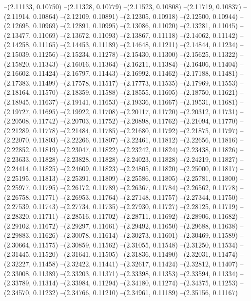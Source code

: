--(2.11133, 0.10750)
--(2.11328, 0.10779)
--(2.11523, 0.10808)
--(2.11719, 0.10837)
--(2.11914, 0.10864)
--(2.12109, 0.10891)
--(2.12305, 0.10918)
--(2.12500, 0.10944)
--(2.12695, 0.10969)
--(2.12891, 0.10995)
--(2.13086, 0.11020)
--(2.13281, 0.11045)
--(2.13477, 0.11069)
--(2.13672, 0.11093)
--(2.13867, 0.11118)
--(2.14062, 0.11142)
--(2.14258, 0.11165)
--(2.14453, 0.11189)
--(2.14648, 0.11211)
--(2.14844, 0.11234)
--(2.15039, 0.11256)
--(2.15234, 0.11278)
--(2.15430, 0.11300)
--(2.15625, 0.11322)
--(2.15820, 0.11343)
--(2.16016, 0.11364)
--(2.16211, 0.11384)
--(2.16406, 0.11404)
--(2.16602, 0.11424)
--(2.16797, 0.11443)
--(2.16992, 0.11462)
--(2.17188, 0.11481)
--(2.17383, 0.11499)
--(2.17578, 0.11517)
--(2.17773, 0.11535)
--(2.17969, 0.11553)
--(2.18164, 0.11570)
--(2.18359, 0.11588)
--(2.18555, 0.11605)
--(2.18750, 0.11621)
--(2.18945, 0.11637)
--(2.19141, 0.11653)
--(2.19336, 0.11667)
--(2.19531, 0.11681)
--(2.19727, 0.11695)
--(2.19922, 0.11708)
--(2.20117, 0.11720)
--(2.20312, 0.11731)
--(2.20508, 0.11742)
--(2.20703, 0.11752)
--(2.20898, 0.11762)
--(2.21094, 0.11770)
--(2.21289, 0.11778)
--(2.21484, 0.11785)
--(2.21680, 0.11792)
--(2.21875, 0.11797)
--(2.22070, 0.11803)
--(2.22266, 0.11807)
--(2.22461, 0.11812)
--(2.22656, 0.11816)
--(2.22852, 0.11819)
--(2.23047, 0.11822)
--(2.23242, 0.11824)
--(2.23438, 0.11826)
--(2.23633, 0.11828)
--(2.23828, 0.11828)
--(2.24023, 0.11828)
--(2.24219, 0.11827)
--(2.24414, 0.11825)
--(2.24609, 0.11823)
--(2.24805, 0.11820)
--(2.25000, 0.11817)
--(2.25195, 0.11813)
--(2.25391, 0.11809)
--(2.25586, 0.11805)
--(2.25781, 0.11800)
--(2.25977, 0.11795)
--(2.26172, 0.11789)
--(2.26367, 0.11784)
--(2.26562, 0.11778)
--(2.26758, 0.11771)
--(2.26953, 0.11764)
--(2.27148, 0.11757)
--(2.27344, 0.11750)
--(2.27539, 0.11743)
--(2.27734, 0.11735)
--(2.27930, 0.11727)
--(2.28125, 0.11719)
--(2.28320, 0.11711)
--(2.28516, 0.11702)
--(2.28711, 0.11692)
--(2.28906, 0.11682)
--(2.29102, 0.11672)
--(2.29297, 0.11661)
--(2.29492, 0.11650)
--(2.29688, 0.11638)
--(2.29883, 0.11626)
--(2.30078, 0.11614)
--(2.30273, 0.11601)
--(2.30469, 0.11589)
--(2.30664, 0.11575)
--(2.30859, 0.11562)
--(2.31055, 0.11548)
--(2.31250, 0.11534)
--(2.31445, 0.11520)
--(2.31641, 0.11505)
--(2.31836, 0.11490)
--(2.32031, 0.11474)
--(2.32227, 0.11458)
--(2.32422, 0.11441)
--(2.32617, 0.11424)
--(2.32812, 0.11407)
--(2.33008, 0.11389)
--(2.33203, 0.11371)
--(2.33398, 0.11353)
--(2.33594, 0.11334)
--(2.33789, 0.11314)
--(2.33984, 0.11294)
--(2.34180, 0.11274)
--(2.34375, 0.11253)
--(2.34570, 0.11232)
--(2.34766, 0.11210)
--(2.34961, 0.11189)
--(2.35156, 0.11167)
